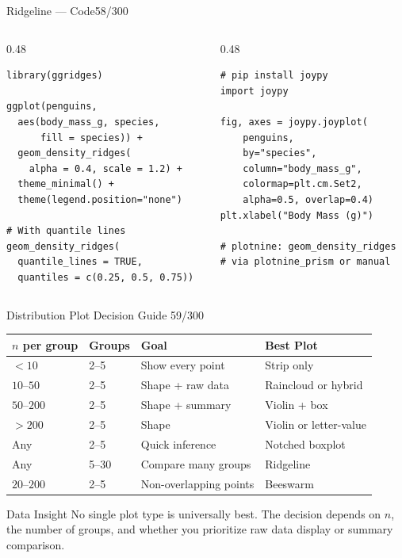 \documentclass[10pt]{beamer}
\newcommand{\smark}[1]{\hfill{\scriptsize\color{codegray}#1}}
\begin{document}
\begin{frame}[fragile]{Ridgeline --- Code}\smark{58/300}
\begin{columns}[T]
\begin{column}{0.48\textwidth}
\begin{lstlisting}[style=Rstyle]
library(ggridges)

ggplot(penguins,
  aes(body_mass_g, species,
      fill = species)) +
  geom_density_ridges(
    alpha = 0.4, scale = 1.2) +
  theme_minimal() +
  theme(legend.position="none")

# With quantile lines
geom_density_ridges(
  quantile_lines = TRUE,
  quantiles = c(0.25, 0.5, 0.75))
\end{lstlisting}
\end{column}
\begin{column}{0.48\textwidth}
\begin{lstlisting}[style=Pystyle]
# pip install joypy
import joypy

fig, axes = joypy.joyplot(
    penguins,
    by="species",
    column="body_mass_g",
    colormap=plt.cm.Set2,
    alpha=0.5, overlap=0.4)
plt.xlabel("Body Mass (g)")

# plotnine: geom_density_ridges
# via plotnine_prism or manual
\end{lstlisting}
\end{column}
\end{columns}
\end{frame}

\begin{frame}{Distribution Plot Decision Guide}
\smark{59/300}
\centering\small
\begin{tabular}{@{}llll@{}}
    \toprule
    \textbf{$n$ per group} & \textbf{Groups} & \textbf{Goal} & \textbf{Best Plot} \\
    \midrule
    $< 10$        & 2--5    & Show every point        & Strip only \\
    $10$--$50$    & 2--5    & Shape + raw data        & Raincloud or hybrid \\
    $50$--$200$   & 2--5    & Shape + summary         & Violin + box \\
    $> 200$       & 2--5    & Shape                   & Violin or letter-value \\
    Any           & 2--5    & Quick inference         & Notched boxplot \\
    Any           & 5--30   & Compare many groups     & Ridgeline \\
    $20$--$200$   & 2--5    & Non-overlapping points  & Beeswarm \\
    \bottomrule
\end{tabular}

\vspace{0.3cm}
\begin{exampleblock}{Data Insight}
    \scriptsize No single plot type is universally best. The decision depends on $n$, the number of groups, and whether you prioritize raw data display or summary comparison.
\end{exampleblock}
\end{frame}
\end{document}
